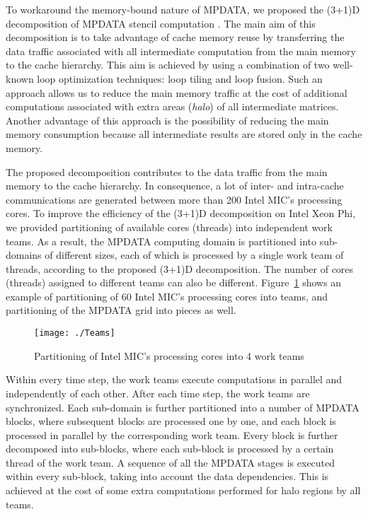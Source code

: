 \documentclass{acm_proc_article-sp}
\begin{document}
To workaround the memory-bound nature of MPDATA, we proposed the (3+1)D decomposition of MPDATA stencil computation \cite{SZU15}.
The main aim of this decomposition is to take advantage of cache memory reuse by transferring the data traffic associated with all intermediate computation from the main memory to the cache hierarchy.
This aim is achieved by using a combination of two \mbox{well-known} loop optimization techniques: loop tiling and loop fusion.
Such an approach allows us to reduce the main memory traffic at the cost of additional computations associated with extra areas (\emph{halo}) of all intermediate matrices.
Another advantage of this approach is the possibility of reducing the main memory consumption because all intermediate results are stored only in the cache memory.

The proposed decomposition contributes to the data traffic from the main memory to the cache hierarchy.
In consequence, a lot of inter- and intra-cache communications are generated between more than 200 Intel MIC's processing cores.
To improve the efficiency of the (3+1)D decomposition on Intel Xeon Phi, we provided partitioning of available cores (threads) into independent work teams.
As a result, the MPDATA computing domain is partitioned into  sub-domains of different sizes, each of which is processed by a single work team of threads, according to the proposed (3+1)D decomposition.
The number of cores (threads) assigned to different teams can also be different.
Figure~\ref{fig:MPDATAteam} shows an example of partitioning of 60 Intel MIC's processing cores into  teams, and partitioning of the MPDATA grid into  pieces as well.
\begin{figure}[h!]
\begin{center}
\texttt{[image: ./Teams]}
\caption{Partitioning of Intel MIC's processing cores into 4 work teams}
\label{fig:MPDATAteam}
\end{center}
\end{figure} 

Within every time step, the work teams execute computations in parallel and independently of each other.
After each time step, the work teams are synchronized.
Each sub-domain is further partitioned into a number of MPDATA blocks, where subsequent blocks are processed one by one, and each block is processed in parallel by the corresponding work team.
Every block is further decomposed into sub-blocks, where each sub-block is processed by a certain thread of the work team.
A sequence of all the MPDATA stages is executed within every sub-block, taking into account the data dependencies.
This is achieved at the cost of some extra computations performed for halo regions by all teams.
\end{document}
